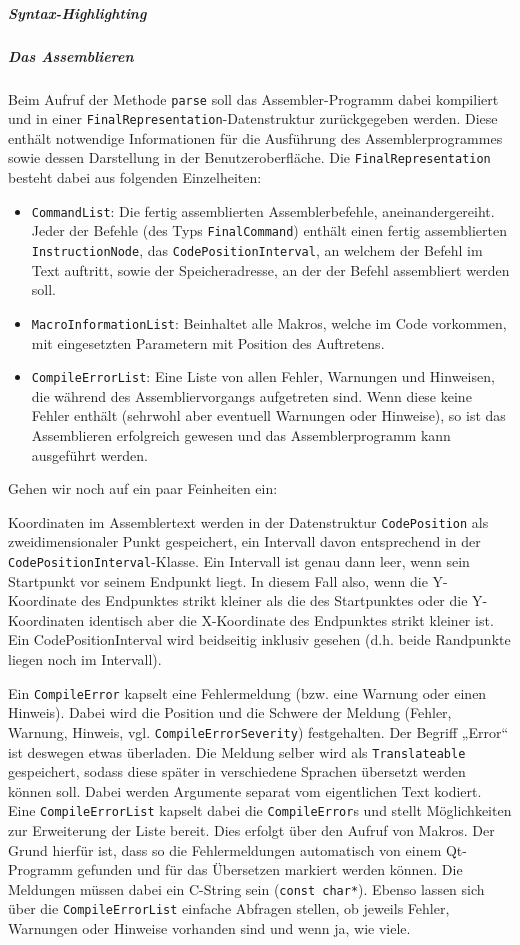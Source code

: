 \subparagraph{Syntax-Highlighting}
\subparagraph{Das Assemblieren}
Beim Aufruf der Methode \texttt{parse} soll das Assembler-Programm dabei kompiliert und in einer \texttt{FinalRepresentation}-Datenstruktur zurückgegeben werden. Diese enthält notwendige Informationen für die Ausführung des Assemblerprogrammes sowie dessen Darstellung in der Benutzeroberfläche.
Die \texttt{FinalRepresentation} besteht dabei aus folgenden Einzelheiten:
\begin{itemize}
\item \texttt{CommandList}: Die fertig assemblierten Assemblerbefehle, aneinandergereiht. Jeder der Befehle (des Typs \texttt{FinalCommand}) enthält einen fertig assemblierten \texttt{InstructionNode}, das \texttt{CodePositionInterval}, an welchem der Befehl im Text auftritt, sowie der Speicheradresse, an der der Befehl assembliert werden soll.
\item \texttt{MacroInformationList}: Beinhaltet alle Makros, welche im Code vorkommen, mit eingesetzten Parametern mit Position des Auftretens.
\item \texttt{CompileErrorList}: Eine Liste von allen Fehler, Warnungen und Hinweisen, die während des Assembliervorgangs aufgetreten sind. Wenn diese keine Fehler enthält (sehrwohl aber eventuell Warnungen oder Hinweise), so ist das Assemblieren erfolgreich gewesen und das Assemblerprogramm kann ausgeführt werden.
\end{itemize}

Gehen wir noch auf ein paar Feinheiten ein:

Koordinaten im Assemblertext werden in der Datenstruktur \texttt{CodePosition} als zweidimensionaler Punkt gespeichert, ein Intervall davon entsprechend in der \texttt{CodePositionInterval}-Klasse. Ein Intervall ist genau dann leer, wenn sein Startpunkt vor seinem Endpunkt liegt. In diesem Fall also, wenn die Y-Koordinate des Endpunktes strikt kleiner als die des Startpunktes oder die Y-Koordinaten identisch aber die X-Koordinate des Endpunktes strikt kleiner ist. Ein CodePositionInterval wird beidseitig inklusiv gesehen (d.h. beide Randpunkte liegen noch im Intervall).

Ein \texttt{CompileError} kapselt eine Fehlermeldung (bzw. eine Warnung oder einen Hinweis). Dabei wird die Position und die Schwere der Meldung (Fehler, Warnung, Hinweis, vgl. \texttt{CompileErrorSeverity}) festgehalten. Der Begriff „Error“ ist deswegen etwas überladen. Die Meldung selber wird als \texttt{Translateable} gespeichert, sodass diese später in verschiedene Sprachen übersetzt werden können soll. Dabei werden Argumente separat vom eigentlichen Text kodiert. Eine \texttt{CompileErrorList} kapselt dabei die \texttt{CompileError}s und stellt Möglichkeiten zur Erweiterung der Liste bereit. Dies erfolgt über den Aufruf von Makros. Der Grund hierfür ist, dass so die Fehlermeldungen automatisch von einem Qt-Programm gefunden und für das Übersetzen markiert werden können. Die Meldungen müssen dabei ein C-String sein (\texttt{const char*}). Ebenso lassen sich über die \texttt{CompileErrorList} einfache Abfragen stellen, ob jeweils Fehler, Warnungen oder Hinweise vorhanden sind und wenn ja, wie viele.

